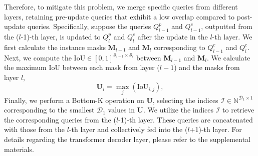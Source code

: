 Therefore, to mitigate this problem, we merge specific queries from different layers, retaining pre-update queries that exhibit a low overlap compared to post-update queries.
Specifically, suppose the queries $Q^p_{l-1}$ and $Q^c_{l-1}$, outputted from the ($l$-1)-th layer, is updated to $Q^p_l$ and $Q^c_l$ after the update in the $l$-th layer.
We first calculate the instance masks $\mathbf{M}_{l-1}$ and $\mathbf{M}_l$ corresponding to $Q^c_{l-1}$ and $Q^c_l$.
Next, we compute the $\text{IoU} \in [0,1]^{\mathcal{S} _{l-1}\times \mathcal{S} _{l}}$ between $\mathbf{M}_{l-1}$ and $\mathbf{M}_l$. 
We calculate the maximum IoU between each mask from layer ($l-1$) and the masks from layer $l$,
\begin{equation}
  \label{iou}
  \mathbf{U}_i = \max_j(\text{IoU}_{i,j}),
\end{equation}
Finally, we perform a Bottom-K operation on $\mathbf{U}$, selecting the indices $\mathcal{I} \in\mathbb{N} ^{\mathcal{D}_1\times 1}$ corresponding to the smallest $\mathcal{D}_1$ values in $\mathbf{U}$. 
We utilize the indices $\mathcal{I}$ to retrieve the corresponding queries from the ($l$-1)-th layer. These queries are concatenated with those from the $l$-th layer and collectively fed into the ($l$+1)-th layer.
For details regarding the transformer decoder layer, please refer to the supplemental materials.

